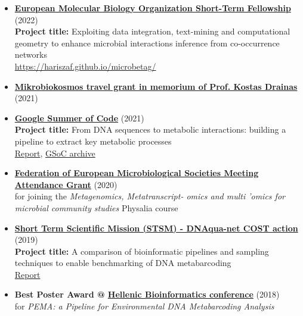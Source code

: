 \begin{itemize}

   \item{
      \textbf{\href{https://www.embo.org/funding/fellowships-grants-and-career-support/scientific-exchange-grants/}{European Molecular Biology Organization Short-Term Fellowship}} (2022) \\ 
      \textbf{Project title:} Exploiting data integration, text-mining and computational geometry to enhance microbial interactions inference from  co-occurrence networks \\
      \href{Report}{https://hariszaf.github.io/microbetag/}

   }

   \item{
      \textbf{\href{https://www.mikrobiokosmos2021.org/}{Mikrobiokosmos travel grant in memorium of Prof. Kostas Drainas}} (2021) 
   }

   \item{
      \textbf{\href{https://summerofcode.withgoogle.com/}{Google Summer of Code}} (2021) \\
      \textbf{Project title:} From DNA sequences to metabolic interactions: building a pipeline to extract key metabolic processes \\
      \href{https://summerofcode.withgoogle.com/archive/2021/projects/6407348884602880}{Report}, \href{https://hariszaf.github.io/gsoc2021/}{GSoC archive}
   }

   \item{
      \textbf{\href{https://fems-microbiology.org/}{Federation of European Microbiological Societies Meeting Attendance Grant}} (2020) \\ 
      for joining the \textit{Metagenomics, Metatranscript- omics and multi 'omics for microbial community studies} Physalia course

   }

   \item{
      \textbf{\href{https://dnaqua.net/stsms/}{Short Term Scientific Mission (STSM) - DNAqua-net COST action}} (2019) \\
      \textbf{Project title:} 
      A comparison of bioinformatic pipelines and sampling techniques to enable benchmarking of DNA metabarcoding \\
      \href{http://dnaqua.net/wp-content/uploads/2019/08/Zafeiropoulos.pdf}{Report}
   }

   \item{
      \textbf{Best Poster Award @ \href{https://hscbio.wordpress.com/}{Hellenic Bioinformatics conference}} (2018) \\
      for \textit{PEMA: a Pipeline for Environmental DNA Metabarcoding Analysis}
   }

\end{itemize}






